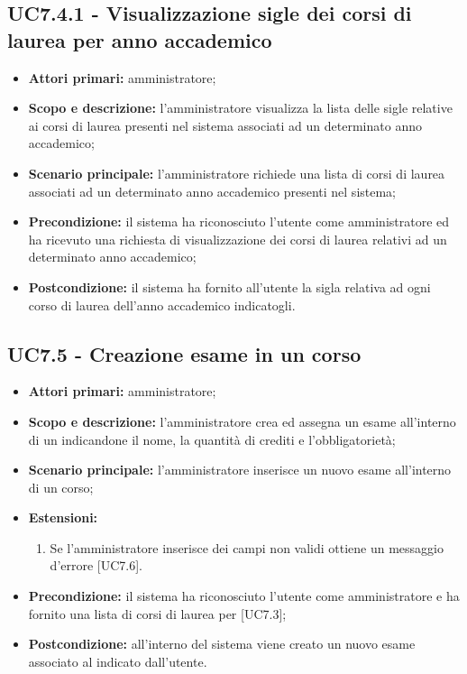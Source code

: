 \documentclass[AnalisiDeiRequisiti.tex]{subfiles}
\begin{document}
\subsection{UC7.4.1 - Visualizzazione sigle dei corsi di laurea per anno accademico}
\begin{itemize}
	\item \textbf{Attori primari:} amministratore;
	\item \textbf{Scopo e descrizione:} l'amministratore visualizza la lista delle sigle relative ai corsi di laurea presenti nel sistema associati ad un determinato anno accademico;
	\item \textbf{Scenario principale:} l'amministratore richiede una lista di corsi di laurea associati ad un determinato anno accademico presenti nel sistema;
	\item \textbf{Precondizione:} il sistema ha riconosciuto l'utente come amministratore ed ha ricevuto una richiesta di visualizzazione dei corsi di laurea relativi ad un determinato anno accademico; 
	\item \textbf{Postcondizione:} il sistema ha fornito all'utente la sigla relativa ad ogni corso di laurea dell'anno accademico indicatogli.
\end{itemize}

\subsection{UC7.5 - Creazione esame in un corso}
\begin{itemize}
	\item \textbf{Attori primari:} amministratore;
	\item \textbf{Scopo e descrizione:} l'amministratore crea ed assegna un esame all'interno di un  indicandone il nome, la quantità di crediti e l'obbligatorietà;
	\item \textbf{Scenario principale:} l'amministratore inserisce un nuovo esame all'interno di un corso;
	\item \textbf{Estensioni:}
	\begin{enumerate}
		\item Se l'amministratore inserisce dei campi non validi ottiene un messaggio d'errore [UC7.6].
	\end{enumerate}
	\item \textbf{Precondizione:} il sistema ha riconosciuto l'utente come amministratore e ha fornito una lista di corsi di laurea per  [UC7.3];
	\item \textbf{Postcondizione:} all'interno del sistema viene creato un nuovo esame associato al  indicato dall'utente.
\end{itemize}
\end{document}
